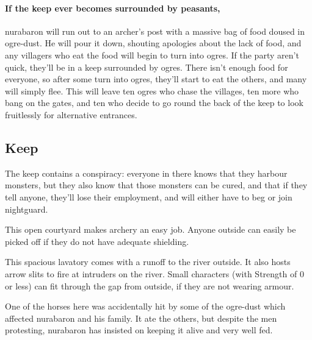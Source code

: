 \begin{multicols}{2}
\paragraph{If the keep ever becomes surrounded by peasants,}
\gls{nurabaron} will run out to an archer's post with a massive bag of food doused in ogre-dust.
He will pour it down, shouting apologies about the lack of food, and any villagers who eat the food will begin to turn into ogres.
If the party aren't quick, they'll be in a keep surrounded by ogres.
There isn't enough food for everyone, so after some turn into ogres, they'll start to eat the others, and many will simply flee.
This will leave ten ogres who chase the villages, ten more who bang on the gates, and ten who decide to go round the back of the keep to look fruitlessly for alternative entrances.

\subsection*{ Keep}


\setcounter{list}{0}

The keep contains a conspiracy: everyone in there knows that they harbour monsters, but they also know that those monsters can be cured, and that if they tell anyone, they'll lose their employment, and will either have to beg or join \gls{nightguard}.



This open courtyard makes archery an easy job.  Anyone outside can easily be picked off if they do not have adequate shielding.


This spacious lavatory comes with a runoff to the river outside.
It also hosts arrow slits to fire at intruders on the river.
Small characters (with Strength of 0 or less) can fit through the gap from outside, if they are not wearing armour.


One of the horses here was accidentally hit by some of the ogre-dust which affected \gls{nurabaron} and his family.  It ate the others, but despite the men protesting, \gls{nurabaron} has insisted on keeping it alive and very well fed.



\end{multicols}
